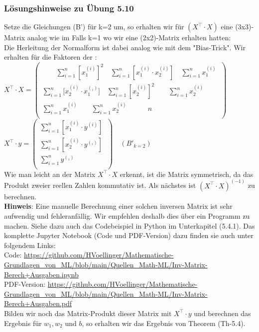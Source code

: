 \documentclass[12pt]{article}
\begin{document}
\subsubsection{Lösungshinweise zu Übung 5.10}
%
Setze die Gleichungen (B') für k=2 um, so erhalten wir für $(X^\top \cdot X)$ eine (3x3)- Matrix analog wie im Falls k=1 wo wir eine (2x2)-Matrix erhalten hatten:\\
Die Herleitung der Normalform ist dabei analog wie mit dem "Bias-Trick". Wir erhalten für die Faktoren der {\color{blue}{Normalform}}:
\\[0.4cm]
\hspace*{-0.5cm}
$ X^\top \cdot X = \left(
  \begin{array}{c}
  \qquad \sum\limits_{i=1}^n [{x_1^{(i)}}]^2 \quad \sum \limits_{i=1}^n [{x_1^{(i)}} \cdot {x_2^{(i)}}] \quad  \sum\limits_{i=1}^n {x_1^{(i)}}  \\
        \sum\limits_{i=1}^n [{x_2^{(i)}} \cdot {{x_1^{(_i)}}] \quad \sum\limits_{i=1}^n [{x_2^{(i)}}]^2} \qquad  \sum\limits_{i=1}^n {x_2^{(i)}} \\
  \sum\limits_{i=1}^n {x_1^{(i)}} \qquad \sum\limits_{i=1}^n {x_2^{(i)}} \quad \qquad n \\
  \end{array}  \
  \right) 
$    
$ X^\top \cdot y = \left(
  \begin{array}{c}
    \sum\limits_{i=1}^n [{x_1^{(i)}} \cdot {{y^{(i)}}}]\\
        \sum\limits_{i=1}^n [{{x_2^{(i)}}} \cdot {{y^{(_i)}}}] \\
    \sum\limits_{i=1}^n {{y^{(_i)}}} \\
  \end{array}  \
  \right) \quad (B'_{k=2})
$     
\\[0.3cm]
Wie man leicht an der Matrix $X^\top \cdot X$ erkennt, ist die Matrix symmetrisch, da das Produkt zweier reellen Zahlen kommutativ ist. Als nächstes ist $(X^\top \cdot X)^{(-1)}$ zu berechnen.\\
\textbf{Hinweis}: Eine manuelle Berechnung einer solchen inversen Matrix ist sehr aufwendig und fehleranfällig. Wir empfehlen deshalb dies über ein Programm zu machen. Siehe dazu auch das Codebeispiel in Python im Unterkapitel (5.4.1). Das komplette Jupyter Notebook (Code und PDF-Version) dazu finden sie auch unter folgendem Links:\\
Code: \url{https://github.com/HVoellinger/Mathematische-Grundlagen_von_ML/blob/main/Quellen_Math-ML/Inv-Matrix-Berech+Ausgaben.ipynb}\\ 
PDF-Version: \url{https://github.com/HVoellinger/Mathematische-Grundlagen_von_ML/blob/main/Quellen_Math-ML/Inv-Matrix-Berech+Ausgaben.pdf} 
\\[0.2cm]
Bilden wir noch das Matrix-Produkt dieser Matrix mit $X^\top \cdot y $ und  berechnen das Ergebnis für $w_1, w_2$ und $b$, so erhalten wir das Ergebnis von Theorem (Th-5.4).
\newpage
\end{document}
